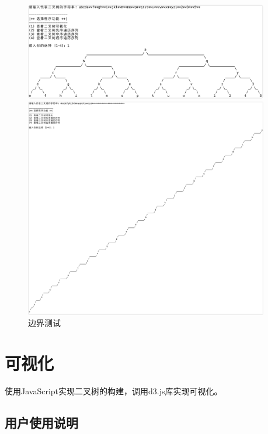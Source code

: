 \documentclass{article}
\begin{document}
\begin{figure}[htbp]

    \centering\includegraphics[width=0.95\textwidth]{./Images/sample5.png}

    \centering\includegraphics[width=0.95\textwidth]{./Images/sample6.png}

    \caption{边界测试}

\end{figure}

\section{可视化}

使用JavaScript实现二叉树的构建，调用d3.js库实现可视化。

\subsection{用户使用说明}
\end{document}
